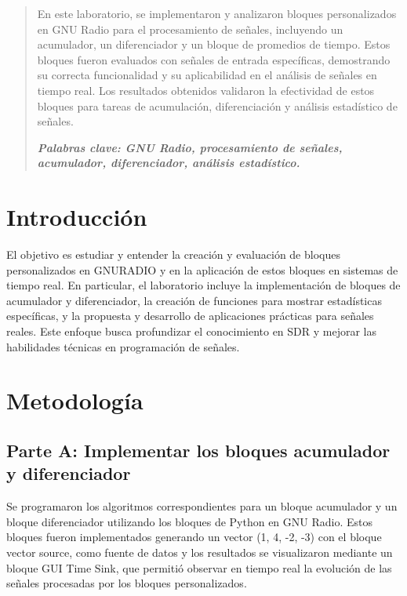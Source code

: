 \documentclass{journal}[IEEEtran, twocolumn]             %
\begin{document}
\begin{multicols}{2}

\begin{abstract}
    En este laboratorio, se implementaron y analizaron bloques personalizados en GNU Radio para el procesamiento de señales, incluyendo un acumulador, un diferenciador y un bloque de promedios de tiempo. Estos bloques fueron evaluados con señales de entrada específicas, demostrando su correcta funcionalidad y su aplicabilidad en el análisis de señales en tiempo real. Los resultados obtenidos validaron la efectividad de estos bloques para tareas de acumulación, diferenciación y análisis estadístico de señales.

 \textit{\textbf{Palabras clave: GNU Radio, procesamiento de señales, acumulador, diferenciador, análisis estadístico.}} 
\end{abstract}

\section{Introducción}
   El objetivo es estudiar y entender la creación y evaluación de bloques personalizados en GNURADIO y en la aplicación de estos bloques en sistemas de tiempo real. En particular, el laboratorio incluye la implementación de bloques de acumulador y diferenciador, la creación de funciones para mostrar estadísticas específicas, y la propuesta y desarrollo de aplicaciones prácticas para señales reales. Este enfoque busca profundizar el conocimiento en SDR y mejorar las habilidades técnicas en programación de señales.


\section{Metodología}
\subsection{Parte A: Implementar los bloques acumulador y diferenciador}

Se programaron los algoritmos correspondientes para un bloque acumulador y un bloque diferenciador utilizando los bloques de Python en GNU Radio. Estos bloques fueron implementados generando un vector (1, 4, -2, -3) con el bloque vector source, como fuente de datos y los resultados se visualizaron mediante un bloque GUI Time Sink, que permitió observar en tiempo real la evolución de las señales procesadas por los bloques personalizados.


\end{multicols}
\end{document}
